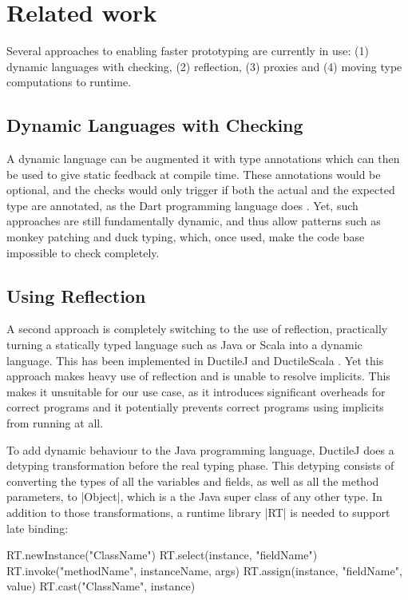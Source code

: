 \section{Related work}

Several approaches to enabling faster prototyping are currently in use: (1) dynamic languages with checking, (2) reflection, (3) proxies and (4) moving type computations to runtime.

\subsection{Dynamic Languages with Checking}

A dynamic language can be augmented it with type annotations which can then be used to give static feedback at compile time. These annotations would be optional, and the checks would only trigger if both the actual and the expected type are annotated, as the Dart programming language does \cite{dart}. Yet, such approaches are still fundamentally dynamic, and thus allow patterns such as monkey patching and duck typing, which, once used, make the code base impossible to check completely.

\subsection{Using Reflection}

A second approach is completely switching to the use of reflection, practically turning a statically typed language such as Java or Scala into a dynamic language. This has been implemented in DuctileJ and DuctileScala \cite{ductilej,ductilescala}. Yet this approach makes heavy use of reflection and is unable to resolve implicits. This makes it unsuitable for our use case, as it introduces significant overheads for correct programs and it potentially prevents correct programs using implicits from running at all.

To add dynamic behaviour to the Java programming language, DuctileJ \cite{ductilej} does a detyping transformation before the real typing phase. This detyping consists of converting the types of all the variables and fields, as well as all the method parameters, to |Object|, which is a the Java super class of any other type. In addition to those transformations, a runtime library |RT| is needed to support late binding:

\begin{lstlisting-nobreak}
RT.newInstance("ClassName")
RT.select(instance, "fieldName")
RT.invoke("methodName", instanceName, args)
RT.assign(instance, "fieldName", value)
RT.cast("ClassName", instance)
\end{lstlisting-nobreak}

